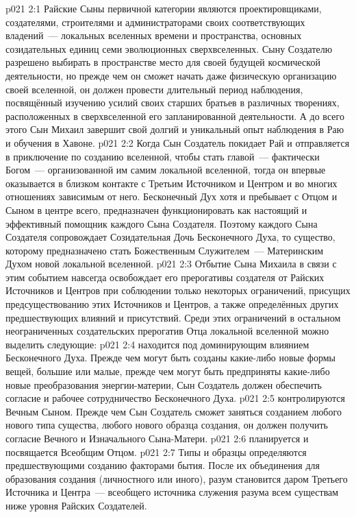 \vs p021 2:1 Райские Сыны первичной категории являются проектировщиками, создателями, строителями и администраторами своих соответствующих владений~--- локальных вселенных времени и пространства, основных созидательных единиц семи эволюционных сверхвселенных. Сыну Создателю разрешено выбирать в пространстве место для своей будущей космической деятельности, но прежде чем он сможет начать даже физическую организацию своей вселенной, он должен провести длительный период наблюдения, посвящённый изучению усилий своих старших братьев в различных творениях, расположенных в сверхвселенной его запланированной деятельности. А до всего этого Сын Михаил завершит свой долгий и уникальный опыт наблюдения в Раю и обучения в Хавоне.
\vs p021 2:2 \pc Когда Сын Создатель покидает Рай и отправляется в приключение по созданию вселенной, чтобы стать главой~--- фактически Богом~--- организованной им самим локальной вселенной, тогда он впервые оказывается в близком контакте с Третьим Источником и Центром и во многих отношениях зависимым от него. Бесконечный Дух хотя и пребывает с Отцом и Сыном в центре всего, предназначен функционировать как настоящий и эффективный помощник каждого Сына Создателя. Поэтому каждого Сына Создателя сопровождает Созидательная Дочь Бесконечного Духа, то существо, которому предназначено стать Божественным Служителем~--- Материнским Духом новой локальной вселенной.
\vs p021 2:3 Отбытие Сына Михаила в связи с этим событием навсегда освобождает его прерогативы создателя от Райских Источников и Центров при соблюдении только некоторых ограничений, присущих предсуществованию этих Источников и Центров, а также определённых других предшествующих влияний и присутствий. Среди этих ограничений в остальном неограниченных создательских прерогатив Отца локальной вселенной можно выделить следующие:
\vs p021 2:4  находится под доминирующим влиянием Бесконечного Духа. Прежде чем могут быть созданы какие\hyp{}либо новые формы вещей, большие или малые, прежде чем могут быть предприняты какие\hyp{}либо новые преобразования энергии\hyp{}материи, Сын Создатель должен обеспечить согласие и рабочее сотрудничество Бесконечного Духа.
\vs p021 2:5  контролируются Вечным Сыном. Прежде чем Сын Создатель сможет заняться созданием любого нового типа существа, любого нового образца создания, он должен получить согласие Вечного и Изначального Сына\hyp{}Матери.
\vs p021 2:6  планируется и посвящается Всеобщим Отцом.
\vs p021 2:7 \pc Типы и образцы  определяются предшествующими созданию факторами бытия. После их объединения для образования создания (личностного или иного), разум становится даром Третьего Источника и Центра~--- всеобщего источника служения разума всем существам ниже уровня Райских Создателей.
